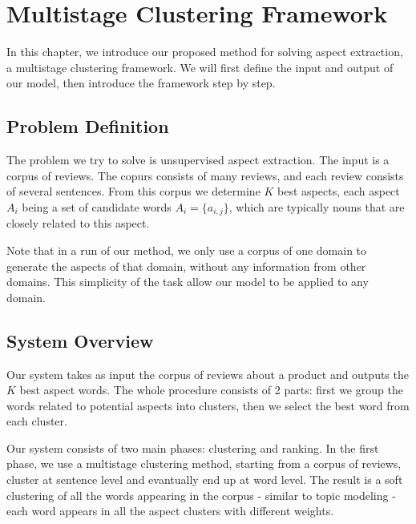\chapter{Multistage Clustering Framework}

In this chapter, we introduce our proposed method for solving aspect extraction, a multistage clustering framework. We will first define the input and output of our model, then introduce the framework step by step.

\section{Problem Definition}

The problem we try to solve is unsupervised aspect extraction. The input is a corpus of reviews. The copurs consists of many reviews, and each review consists of several sentences. From this corpus we determine $K$ best aspects, each aspect $A_i$ being a set of candidate words $A_i = \{a_{i,j}\}$, which are typically nouns that are closely related to this aspect.

Note that in a run of our method, we only use a corpus of one domain to generate the aspects of that domain, without any information from other domains. This simplicity of the task allow our model to be applied to any domain.

\section{System Overview}

Our system takes as input the corpus of reviews about a product and outputs the $K$ best aspect words. The whole procedure consists of 2 parts: first we group the words related to potential aspects into clusters, then we select the best word from each cluster.

Our system consists of two main phases: clustering and ranking. In the first phase, we use a multistage clustering method, starting from a corpus of reviews, cluster at sentence level and evantually end up at word level. The result is a soft clustering of all the words appearing in the corpus - similar to topic modeling - each word appears in all the aspect clusters with different weights.

